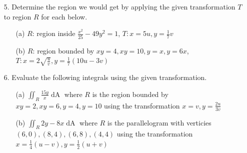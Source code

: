 \documentclass[12pt, amssymb, one column]{article}
\begin{document}
\begin{itemize}
	\item[5.] Determine the region we would get by applying the given transformation $T$ to region $R$ for each below.
		\begin{itemize}
			\item[(a)] $R$: region inside $\frac{x^2}{25}-49y^2=1$, $T: x=5u, y=\frac{1}{7}v$
			\item[(b)] $R$: region bounded by $xy=4, xy=10, y=x, y=6x$, $T: x=2\sqrt{\frac{u}{v}}, y=\frac{1}{7}(10u-3v)$
		\end{itemize}
	
	\item[6.] Evaluate the following integrals using the given transformation.
		\begin{itemize}
			\item[(a)] $\iint_R \frac{15y}{x} \mathop{dA}$ where $R$ is the region bounded by $xy=2, xy=6, y=4, y=10$ using the transformation $x=v, y=\frac{2u}{3v}$
			\item[(b)] $\iint_R 2y-8x \mathop{dA}$ where $R$ is the parallelogram with verticies $(6,0), (8,4), (6,8), (4,4)$ using the transformation $x=\frac{1}{4}(u-v), y=\frac{1}{2}(u+v)$
		\end{itemize}
\end{itemize}
\end{document}
